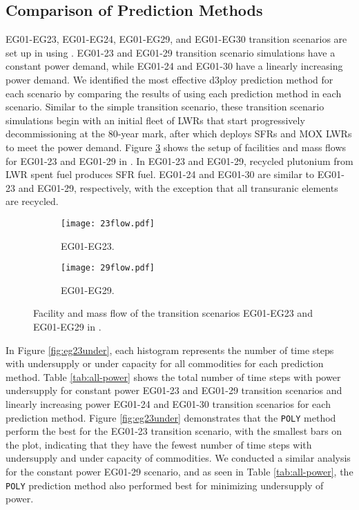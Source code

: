\subsection{Comparison of Prediction Methods}

EG01-EG23, EG01-EG24, EG01-EG29, and EG01-EG30 transition scenarios
are set up in \Cyclus using \deploy. 
EG01-23 and EG01-29 transition scenario simulations have a constant 
power demand, while EG01-24 and EG01-30 have a linearly increasing
power demand. 
We identified the most effective d3ploy prediction method 
for each scenario by comparing the results of using each 
prediction method in each scenario. 
Similar to the simple transition scenario, these transition scenario 
simulations begin with an initial fleet of \glspl{LWR} 
that start progressively decommissioning at the 80-year mark, 
after which \deploy deploys \glspl{SFR} and \gls{MOX} \glspl{LWR} to meet 
the power demand. 
Figure \ref{fig:eg2329}
shows the setup of facilities and mass flows for 
EG01-23 and EG01-29 in \Cyclus. 
In EG01-23 and EG01-29, recycled plutonium from LWR spent fuel 
produces  \gls{SFR} fuel. 
EG01-24 and EG01-30 are similar to EG01-23 and EG01-29, respectively, 
with the exception that all transuranic elements are recycled.

\begin{figure}[]
	\centering
	\begin{subfigure}[t]{\textwidth}
		\centering
		\texttt{[image: 23flow.pdf]} 
		\caption{EG01-EG23.}
		\label{fig:23flow}
	\end{subfigure}
	\vspace{1cm}
	\begin{subfigure}[t]{\textwidth}
		\centering
		\texttt{[image: 29flow.pdf]} 
		\caption{EG01-EG29.}
		\label{fig:29flow}
	\end{subfigure}
	\hfill
	\caption{Facility and mass flow of the transition scenarios EG01-EG23 and EG01-EG29 in \Cyclus.}
	\label{fig:eg2329}
\end{figure}

In Figure \ref{fig:eg23under}, each histogram represents 
the number of time steps with undersupply or 
under capacity for all commodities for each prediction method.  
Table \ref{tab:all-power} shows the total number of time steps with power 
undersupply for constant power EG01-23 and EG01-29 transition scenarios and
linearly increasing power EG01-24 and EG01-30 transition scenarios
for each prediction method. 
Figure \ref{fig:eg23under} demonstrates that the \texttt{POLY} method
perform the best for the EG01-23 transition scenario,
with the smallest bars on the plot, indicating that they have the 
fewest number of time steps with undersupply and under capacity
of commodities. 
We conducted a similar analysis for the constant power EG01-29 scenario,
and as seen in Table \ref{tab:all-power}, the \texttt{POLY} prediction method 
also performed best for minimizing undersupply of power.  

